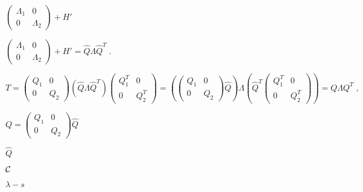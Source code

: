 {\newpage\clearpage
{}%
$\left( \begin{array}{cc} \Lambda_1 & 0 \\0 & \Lambda_2 \end{array} \right) + H'$%
\lthtmlinlinemathZ
\lthtmlcheckvsize\clearpage}

{\newpage\clearpage
{}%
$
\left( \begin{array}{cc} \Lambda_1 & 0 \\0 & \Lambda_2 \end{array} \right) + H' =
\hat{Q} \Lambda \hat{Q}^T \; .
$%
\lthtmlinlinemathZ
\lthtmlcheckvsize\clearpage}

{\newpage\clearpage
{}%
\begin{displaymath}
T =
\left( \begin{array}{cc} Q_1 & 0 \\0 & Q_2 \end{array} \right) 
\left( \hat{Q} {\Lambda} \hat{Q}^T \right) \left( \begin{array}{cc} Q_1^T & 0 \\0 & Q_2^T
\end{array} \right) =
\left( \left( \begin{array}{cc} Q_1 & 0 \\0 & Q_2 \end{array} \right) \hat{Q} \right)
{\Lambda}
\left( \hat{Q}^T \left( \begin{array}{cc} Q_1^T & 0 \\0 & Q_2^T \end{array} \right) \right) =
Q \Lambda Q^T \; ,
\end{displaymath}%
\lthtmldisplayZ
\lthtmlcheckvsize\clearpage}

{\newpage\clearpage
{}%
$Q = \left( \begin{array}{cc} Q_1 & 0 \\0 & Q_2 \end{array} \right) \hat{Q}$%
\lthtmlinlinemathZ
\lthtmlcheckvsize\clearpage}

{\newpage\clearpage
{}%
$\hat{Q}$%
\lthtmlinlinemathZ
\lthtmlcheckvsize\clearpage}

{\newpage\clearpage
{}%
$\cal C$%
\lthtmlinlinemathZ
\lthtmlcheckvsize\clearpage}

{\newpage\clearpage
{}%
$\lambda - s$%
\lthtmlinlinemathZ
\lthtmlcheckvsize\clearpage}

